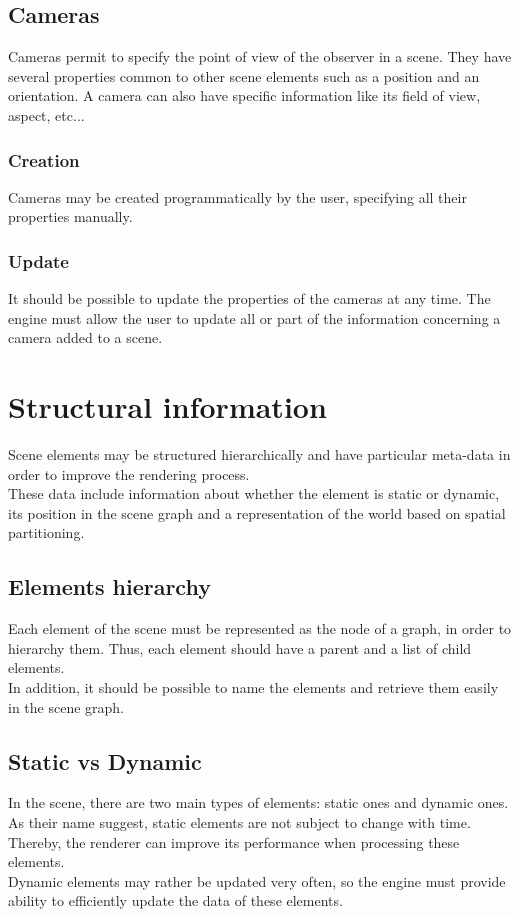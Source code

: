 \documentclass [a4 paper,11pt]{article}
\begin{document}
\subsection{Cameras}
Cameras permit to specify the point of view of the observer in a scene. They have several properties common to other scene elements such as a position and an orientation. A camera can also have specific information like its field of view, aspect, etc...
\subsubsection{Creation}
Cameras may be created programmatically by the user, specifying all their properties manually.
\subsubsection{Update}
It should be possible to update the properties of the cameras at any time. The engine must allow the user to update all or part of the information concerning a camera added to a scene.

\section{Structural information}
Scene elements may be structured hierarchically and have particular meta-data in order to improve the rendering process.\\
These data include information about whether the element is static or dynamic, its position in the scene graph and a representation of the world based on spatial partitioning.

\subsection{Elements hierarchy}
Each element of the scene must be represented as the node of a graph, in order to hierarchy them. Thus, each element should have a parent and a list of child elements.\\
In addition, it should be possible to name the elements and retrieve them easily in the scene graph.

\subsection{Static vs Dynamic}
In the scene, there are two main types of elements: static ones and dynamic ones.\\
As their name suggest, static elements are not subject to change with time. Thereby, the renderer can improve its performance when processing these elements.\\
Dynamic elements may rather be updated very often, so the engine must provide ability to efficiently update the data of these elements.
\end{document}
